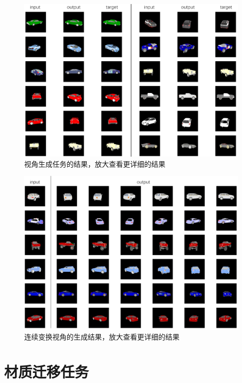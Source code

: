 \documentclass[UTF8,openany,AutoFakeBold,AutoFakeSlant,cs4size]{ctexbook}
\begin{document}
\begin{figure}
\centering
\includegraphics[width=\linewidth]{./images/novel_view_thesis.png}
\caption{视角生成任务的结果，放大查看更详细的结果}
\label{result_viewsynthesis}
\end{figure}

\begin{figure}
\centering
\includegraphics[width=\linewidth]{./images/novel_view_thesis_rotate.png}
\caption{连续变换视角的生成结果，放大查看更详细的结果}
\label{result_contview}
\end{figure}

\section{材质迁移任务}
\end{document}
